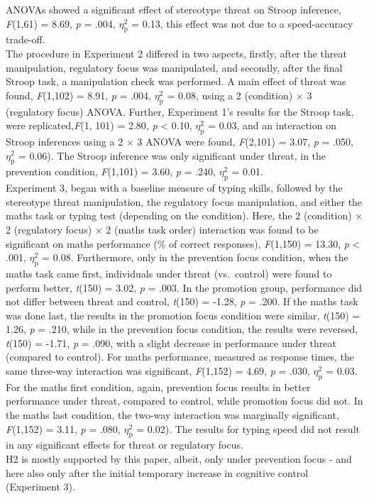 \documentclass[
  stu,floatsintext]{apa7}
\begin{document}
ANOVAs showed a significant effect of stereotype threat on Stroop inference, \emph{F}(1,61) = 8.69, \emph{p} = .004, \(\eta^{2}_{\text{p}}\) = 0.13, this effect was not due to a speed-accuracy trade-off.\\
The procedure in Experiment 2 differed in two aspects, firstly, after the threat manipulation, regulatory focus was manipulated, and secondly, after the final Stroop task, a manipulation check was performed.
A main effect of threat was found, \emph{F}(1,102) = 8.91, \emph{p} = .004, \(\eta^{2}_{\text{p}}\) = 0.08, using a 2 (condition) \(\times\) 3 (regulatory focus) ANOVA.
Further, Experiment 1's results for the Stroop task, were replicated,\emph{F}(1, 101) = 2.80, \emph{p} \textless{} 0.10, \(\eta^{2}_{\text{p}}\) = 0.03, and an interaction on Stroop inferences using a 2 \(\times\) 3 ANOVA were found, \emph{F}(2,101) = 3.07, \emph{p} = .050, \(\eta^{2}_{\text{p}}\) = 0.06).
The Stroop inference was only significant under threat, in the prevention condition, \emph{F}(1,101) = 3.60, \emph{p} = .240, \(\eta^{2}_{\text{p}}\) = 0.01.\\
Experiment 3, began with a baseline measure of typing skills, followed by the stereotype threat manipulation, the regulatory focus manipulation, and either the maths task or typing test (depending on the condition).
Here, the 2 (condition) \(\times\) 2 (regulatory focus) \(\times\) 2 (maths task order) interaction was found to be significant on maths performance (\% of correct responses), \emph{F}(1,150) = 13.30, \emph{p} \textless{} .001, \(\eta^{2}_{\text{p}}\) = 0.08.
Furthermore, only in the prevention focus condition, when the maths task came first, individuals under threat (vs.~control) were found to perform better, \emph{t}(150) = 3.02, \emph{p} = .003.
In the promotion group, performance did not differ between threat and control, \emph{t}(150) = -1.28, \emph{p} = .200.
If the maths task was done last, the results in the promotion focus condition were similar, \emph{t}(150) = 1.26, \emph{p} = .210, while in the prevention focus condition, the results were reversed, \emph{t}(150) = -1.71, \emph{p} = .090, with a slight decrease in performance under threat (compared to control).
For maths performance, measured as response times, the same three-way interaction was significant, \emph{F}(1,152) = 4.69, \emph{p} = .030, \(\eta^{2}_{\text{p}}\) = 0.03.
For the maths first condition, again, prevention focus results in better performance under threat, compared to control, while promotion focus did not.
In the maths last condition, the two-way interaction was marginally significant, \emph{F}(1,152) = 3.11, \emph{p} = .080, \(\eta^{2}_{\text{p}}\) = 0.02).
The results for typing speed did not result in any significant effects for threat or regulatory focus.\\
H2 is mostly supported by this paper, albeit, only under prevention focus - and here also only after the initial temporary increase in cognitive control (Experiment 3).
\end{document}
